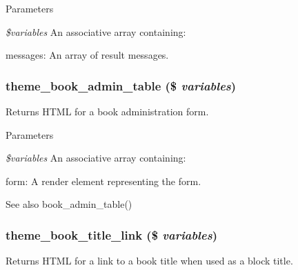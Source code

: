 \begin{DoxyParams}{Parameters}
\item[{\em \$variables}]An associative array containing:
\begin{DoxyItemize}
\item messages: An array of result messages. 
\end{DoxyItemize}\end{DoxyParams}
\hypertarget{group__themeable_gad9629dbe505d7b381ba96e62496035bc}{
\subsubsection[{theme\_\-book\_\-admin\_\-table}]{\setlength{\rightskip}{0pt plus 5cm}theme\_\-book\_\-admin\_\-table (\$ {\em variables})}}
\label{group__themeable_gad9629dbe505d7b381ba96e62496035bc}
Returns HTML for a book administration form.


\begin{DoxyParams}{Parameters}
\item[{\em \$variables}]An associative array containing:
\begin{DoxyItemize}
\item form: A render element representing the form.
\end{DoxyItemize}\end{DoxyParams}
\begin{DoxySeeAlso}{See also}
book\_\-admin\_\-table() 
\end{DoxySeeAlso}
\hypertarget{group__themeable_ga81c31dd7bcb8dda4679c9857b95621c8}{
\subsubsection[{theme\_\-book\_\-title\_\-link}]{\setlength{\rightskip}{0pt plus 5cm}theme\_\-book\_\-title\_\-link (\$ {\em variables})}}
\label{group__themeable_ga81c31dd7bcb8dda4679c9857b95621c8}
Returns HTML for a link to a book title when used as a block title.


